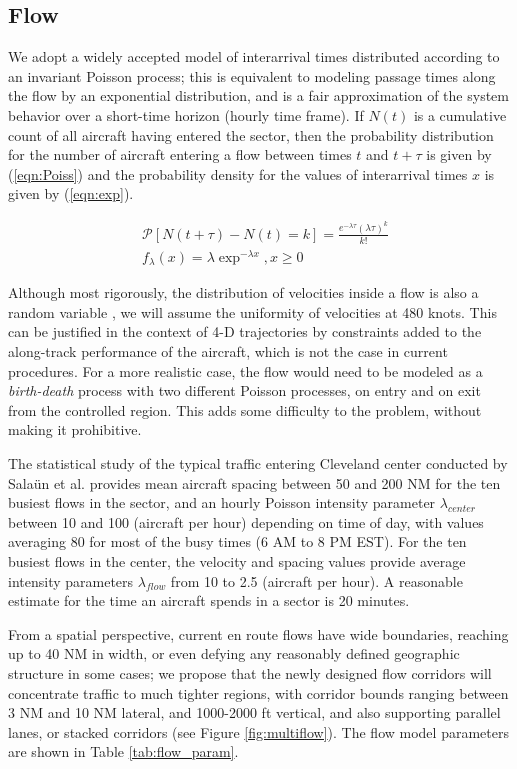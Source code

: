 \documentclass[conference]{IEEEtran}
\begin{document}
\subsection{Flow}
We adopt a widely accepted model of interarrival times distributed according to an invariant Poisson process; this is equivalent to modeling passage times along the flow by an exponential distribution, and is a fair approximation of the system behavior over a short-time horizon (hourly time frame). If $N(t)$ is a cumulative count of all aircraft having entered the sector, then the probability distribution for the number of aircraft entering a flow between times $t$ and $t+\tau$ is given by (\ref{eqn:Poiss}) and the probability density for the values of interarrival times $x$ is given by (\ref{eqn:exp}).

\begin{align}
&\mathcal P[N(t+\tau)-N(t)=k]=\frac{e^{-\lambda\tau}(\lambda\tau)^k}{k!}\label{eqn:Poiss}\\
&f_{\lambda}(x)=\lambda\exp^{-\lambda x}, x\ge 0 \label{eqn:exp}
\end{align}


Although most rigorously, the distribution of velocities inside a flow is also a random variable \cite{Sal11}, we will assume the uniformity of velocities at 480 knots. This can be justified in the context of 4-D trajectories by constraints added to the along-track performance of the aircraft, which is not the case in current procedures. For a more realistic case, the flow would need to be modeled as a \emph{birth-death} process with two different Poisson processes, on entry and on exit from the controlled region. This adds some difficulty to the problem, without making it prohibitive.

The statistical study of the typical traffic entering Cleveland center conducted by Sala\"{u}n et al. \cite{Sal10} provides mean aircraft spacing between 50 and 200 NM for the ten busiest flows in the sector, and an hourly Poisson intensity parameter $\lambda_{center}$ between 10 and 100 (aircraft per hour) depending on time of day, with values averaging 80 for most of the busy times (6 AM to 8 PM EST). For the ten busiest flows in the center, the velocity and spacing values provide average intensity parameters $\lambda_{flow}$ from 10 to 2.5 (aircraft per hour). A reasonable estimate for the time an aircraft spends in a sector is 20 minutes.

From a spatial perspective, current en route flows have wide boundaries, reaching up to 40 NM in width, or even defying any reasonably defined geographic structure in some cases; we propose that the newly designed flow corridors will concentrate traffic to much tighter regions, with corridor bounds ranging between 3 NM and 10 NM lateral, and 1000-2000 ft vertical, and also supporting parallel lanes, or stacked corridors (see Figure \ref{fig:multiflow}). The flow model parameters are shown in Table \ref{tab:flow_param}.
\end{document}
